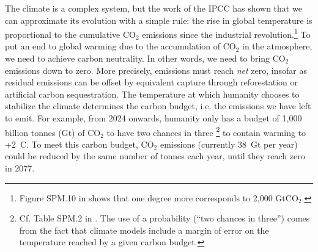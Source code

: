 \documentclass[a5paper,english,openany]{memoir}
\begin{document}
The climate is a complex system, but the work of the IPCC has shown that we can approximate its evolution with a simple rule: the rise in global temperature is proportional to the cumulative CO$_\text{2}$ emissions since the industrial revolution.\footnote{Figure SPM.10 in \citet{ipcc_climate_2021} shows that one degree more corresponds to 2,000 GtCO$_\text{2}$.} 
To put an end to global warming due to the accumulation of CO$_\text{2}$ in the atmosphere, we need to achieve carbon neutrality. In other words, we need to bring CO$_\text{2}$ emissions down to zero. More precisely, emissions must reach \textit{net} zero, insofar as residual emissions can be offset by equivalent capture through reforestation or artificial carbon sequestration. The temperature at which humanity chooses to stabilize %
the climate determines the carbon budget, i.e. the emissions we have left to emit. For example, from 2024 onwards, humanity only has a budget of 1,000 billion tonnes (Gt) of CO$_\text{2}$ to have two chances in three%
\footnote{Cf. Table SPM.2 in \citet{ipcc_climate_2021}. The use of a probability (``two chances in three'') comes from the fact that climate models include a margin of error on the temperature reached by a given carbon budget.} 
to contain warming to +2~\textdegree{}C. 
To meet this carbon budget, CO$_\text{2}$ emissions (currently 38~Gt per year) could be reduced by the same number of tonnes each year, until they reach zero in 2077.  %
\end{document}
